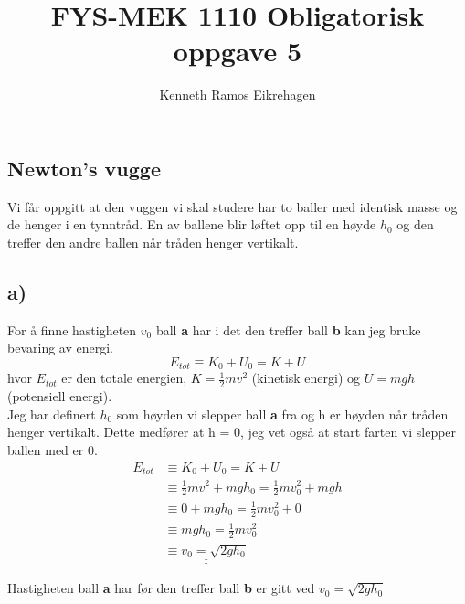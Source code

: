 \documentclass[a4paper,12pt,norsk]{article}
\title{FYS-MEK 1110 Obligatorisk oppgave 5}
\author{Kenneth Ramos Eikrehagen}
\begin{document}
\maketitle
\begin{center}
\section*{Newton's vugge}
\end{center}

Vi får oppgitt at den vuggen vi skal studere har to baller med identisk masse og de henger i en tynntråd. En av ballene blir løftet opp til en høyde $h_0$ og den treffer den andre ballen når tråden henger vertikalt.
\subsection*{a)}
For å finne hastigheten $v_0$ ball \textbf{a} har i det den treffer ball \textbf{b} kan jeg bruke bevaring av energi. $$E_{tot} \equiv K_0 + U_0 = K + U$$ hvor $E_{tot}$ er den totale energien, $K = \frac{1}{2}mv^2$ (kinetisk energi) og $U = mgh$ (potensiell energi). \\ 
Jeg har definert $h_0$ som høyden vi slepper ball \textbf{a} fra og h er høyden når tråden henger vertikalt. Dette medfører at h = 0, jeg vet også at start farten vi slepper ballen med er 0. 
\begin{align*}
E_{tot} &\equiv K_0 + U_0 = K + U\\
&\equiv \frac{1}{2}mv^2 + mgh_0 = \frac{1}{2}mv_0^2 + mgh\\
&\equiv 0 + mgh_0 = \frac{1}{2}mv_0^2 + 0\\
&\equiv mgh_0 = \frac{1}{2}mv_0^2\\
&\underline{\underline{\equiv v_0 = \sqrt{2gh_0}}}
\end{align*}

Hastigheten ball \textbf{a} har før den treffer ball \textbf{b} er gitt ved $v_0 = \sqrt{2gh_0}$
\end{document}
